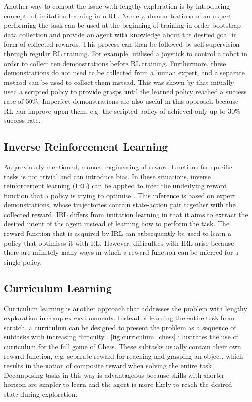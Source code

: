 Another way to combat the issue with lengthy exploration is by introducing concepts of imitation learning into RL. Namely, demonstrations of an expert performing the task can be used at the beginning of training in order bootstrap data collection and provide an agent with knowledge about the desired goal in form of collected rewards. This process can then be followed by self-supervision through regular RL training. For example, \citet{zhan_framework_2020} utilised a joystick to control a robot in order to collect ten demonstrations before RL training. Furthermore, these demonstrations do not need to be collected from a human expert, and a separate method can be used to collect them instead. This was shown by \citet{kalashnikov_qt-opt_2018} that initially used a scripted policy to provide grasps until the learned policy reached a success rate of 50\%. Imperfect demonstrations are also useful in this approach because RL can improve upon them, e.g. the scripted policy of \citet{kalashnikov_qt-opt_2018} achieved only up to 30\% success rate.


\subsection{Inverse Reinforcement Learning}

As previously mentioned, manual engineering of reward functions for specific tasks is not trivial and can introduce bias. In these situations, inverse reinforcement learning (IRL) can be applied to infer the underlying reward function that a policy is trying to optimise \cite{kroemer_review_2021}. This inference is based on expert demonstrations, whose trajectories contain state-action pair together with the collected reward. IRL differs from imitation learning in that it aims to extract the desired intent of the agent instead of learning how to perform the task. The reward function that is acquired by IRL can subsequently be used to learn a policy that optimises it with RL. However, difficulties with IRL arise because there are infinitely many ways in which a reward function can be inferred for a single policy.


\subsection{Curriculum Learning}

Curriculum learning is another approach that addresses the problem with lengthy exploration in complex environments. Instead of learning the entire task from scratch, a curriculum can be designed to present the problem as a sequence of subtasks with increasing difficulty \cite{narvekar_curriculum_2020}. \autoref{fig:curriculum_chess} illustrates the use of curriculum for the full game of Chess. These subtasks usually contain their own reward function, e.g. separate reward for reaching and grasping an object, which results in the notion of composite reward when solving the entire task \cite{popov_data-efficient_2017}. Decomposing tasks in this way is advantageous because skills with shorter horizon are simpler to learn and the agent is more likely to reach the desired state during exploration.

